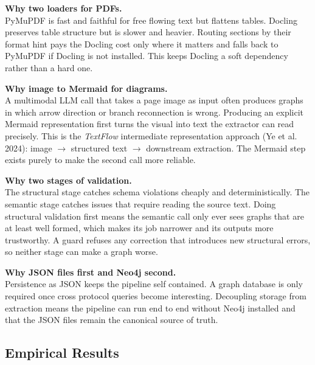 \documentclass{article}
\begin{document}
\begin{conceptbox}
\textbf{Why two loaders for PDFs.}\\
PyMuPDF is fast and faithful for free flowing text but flattens
tables. Docling preserves table structure but is slower and heavier.
Routing sections by their format hint pays the Docling cost only
where it matters and falls back to PyMuPDF if Docling is not
installed. This keeps Docling a soft dependency rather than a hard
one.
\end{conceptbox}

\begin{conceptbox}
\textbf{Why image to Mermaid for diagrams.}\\
A multimodal LLM call that takes a page image as input often produces
graphs in which arrow direction or branch reconnection is wrong.
Producing an explicit Mermaid representation first turns the visual
into text the extractor can read precisely. This is the
\emph{TextFlow} intermediate representation approach (Ye et al.
2024): image $\rightarrow$ structured text $\rightarrow$ downstream
extraction. The Mermaid step exists purely to make the second call
more reliable.
\end{conceptbox}

\begin{conceptbox}
\textbf{Why two stages of validation.}\\
The structural stage catches schema violations cheaply and
deterministically. The semantic stage catches issues that require
reading the source text. Doing structural validation first means the
semantic call only ever sees graphs that are at least well formed,
which makes its job narrower and its outputs more trustworthy. A
guard refuses any correction that introduces new structural errors,
so neither stage can make a graph worse.
\end{conceptbox}

\begin{conceptbox}
\textbf{Why JSON files first and Neo4j second.}\\
Persistence as JSON keeps the pipeline self contained. A graph
database is only required once cross protocol queries become
interesting. Decoupling storage from extraction means the pipeline
can run end to end without Neo4j installed and that the JSON files
remain the canonical source of truth.
\end{conceptbox}

\subsection{Empirical Results}
\label{sec:results}
\end{document}
